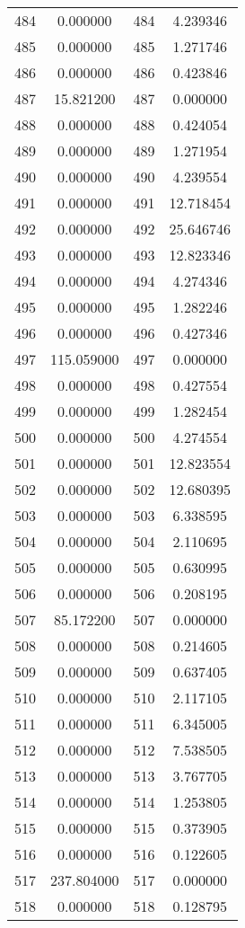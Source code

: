 \documentclass[12pt]{article}
\begin{document}
\begin{longtable}{@{}cccc@{}}
484 & 0.000000 & 484 & 4.239346 \\
485 & 0.000000 & 485 & 1.271746 \\
486 & 0.000000 & 486 & 0.423846 \\
487 & 15.821200 & 487 & 0.000000 \\
488 & 0.000000 & 488 & 0.424054 \\
489 & 0.000000 & 489 & 1.271954 \\
490 & 0.000000 & 490 & 4.239554 \\
491 & 0.000000 & 491 & 12.718454 \\
492 & 0.000000 & 492 & 25.646746 \\
493 & 0.000000 & 493 & 12.823346 \\
494 & 0.000000 & 494 & 4.274346 \\
495 & 0.000000 & 495 & 1.282246 \\
496 & 0.000000 & 496 & 0.427346 \\
497 & 115.059000 & 497 & 0.000000 \\
498 & 0.000000 & 498 & 0.427554 \\
499 & 0.000000 & 499 & 1.282454 \\
500 & 0.000000 & 500 & 4.274554 \\
501 & 0.000000 & 501 & 12.823554 \\
502 & 0.000000 & 502 & 12.680395 \\
503 & 0.000000 & 503 & 6.338595 \\
504 & 0.000000 & 504 & 2.110695 \\
505 & 0.000000 & 505 & 0.630995 \\
506 & 0.000000 & 506 & 0.208195 \\
507 & 85.172200 & 507 & 0.000000 \\
508 & 0.000000 & 508 & 0.214605 \\
509 & 0.000000 & 509 & 0.637405 \\
510 & 0.000000 & 510 & 2.117105 \\
511 & 0.000000 & 511 & 6.345005 \\
512 & 0.000000 & 512 & 7.538505 \\
513 & 0.000000 & 513 & 3.767705 \\
514 & 0.000000 & 514 & 1.253805 \\
515 & 0.000000 & 515 & 0.373905 \\
516 & 0.000000 & 516 & 0.122605 \\
517 & 237.804000 & 517 & 0.000000 \\
518 & 0.000000 & 518 & 0.128795 \\

\end{longtable}
\end{document}
